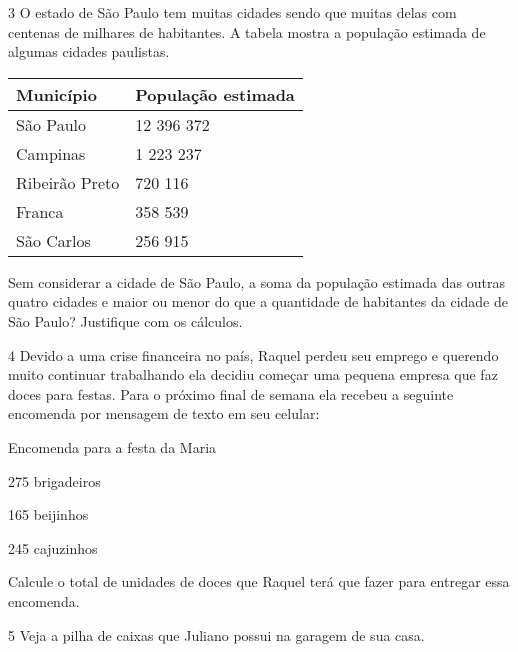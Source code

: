 

\num{3} O estado de São Paulo tem muitas cidades sendo que muitas delas com
centenas de milhares de habitantes. A tabela mostra a população estimada
de algumas cidades paulistas.

\begin{longtable}[]{@{}ll@{}}
\toprule
Município & População estimada\tabularnewline
\midrule
\endhead
São Paulo & 12 396 372\tabularnewline
Campinas & 1 223 237\tabularnewline
Ribeirão Preto & 720 116\tabularnewline
Franca & 358 539\tabularnewline
São Carlos & 256 915\tabularnewline
\bottomrule
\end{longtable}


Sem considerar a cidade de São Paulo, a soma da população estimada das
outras quatro cidades e maior ou menor do que a quantidade de habitantes
da cidade de São Paulo? Justifique com os cálculos.



\num{4} Devido a uma crise financeira no país, Raquel perdeu seu emprego e
querendo muito continuar trabalhando ela decidiu começar uma pequena
empresa que faz doces para festas. Para o próximo final de semana ela
recebeu a seguinte encomenda por mensagem de texto em seu celular:


Encomenda para a festa da Maria

275 brigadeiros

165 beijinhos

245 cajuzinhos

Calcule o total de unidades de doces que Raquel terá que fazer para
entregar essa encomenda.



\num{5} Veja a pilha de caixas que Juliano possui na garagem de sua casa.

